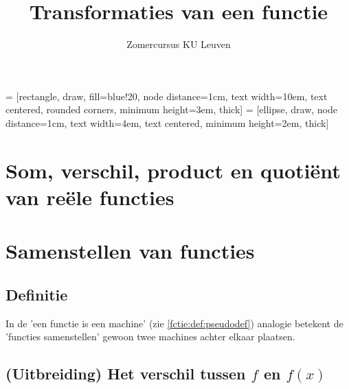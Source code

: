 \documentclass{ximera}
\author{Zomercursus KU Leuven}
\title{Transformaties van een functie}
\begin{document}
\begin{abstract}

\end{abstract}
\maketitle  

 = [rectangle, draw, fill=blue!20, node distance=1cm, text width=10em, text centered, rounded corners, minimum height=3em, thick]
 = [ellipse, draw, node distance=1cm, text width=4em, text centered, minimum height=2em, thick]

\section{Som, verschil, product en quotiënt van reële functies}


\section{Samenstellen van functies}

\subsection{Definitie}
In de 'een functie is een machine' (zie \autoref{fctie:def:pseudodef}) analogie betekent de 'functies samenstellen' gewoon twee machines achter elkaar plaatsen. 



\subsection{(Uitbreiding) Het verschil tussen $f$ en $f(x)$}
\end{document}
